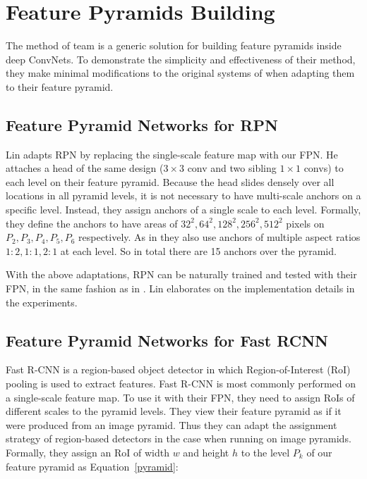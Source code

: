 \documentclass[10pt,twocolumn,letterpaper]{article}
\begin{document}
\section{Feature Pyramids Building}

The method of team is a generic solution for building feature pyramids inside deep ConvNets. To demonstrate the simplicity and effectiveness of their method, they make minimal modifications to the original systems of \cite{ren2015faster,girshick2015fast} when adapting them to their feature pyramid.

\subsection{Feature Pyramid Networks for RPN}

Lin adapts RPN by replacing the single-scale feature map with our FPN. He attaches a head of the same design ($3\times 3$ conv and two sibling $1\times 1$ convs) to each level on their feature pyramid. Because the head slides densely over all locations in all pyramid levels, it is not necessary to have multi-scale anchors on a specific level. Instead, they assign anchors of a single scale to each level. Formally, they define the anchors to have areas of ${32^2, 64^2, 128^2, 256^2, 512^2}$ pixels on ${P_2, P_3, P_4, P_5,P_6}$ respectively. As in \cite{ren2015faster} they also use anchors of multiple aspect ratios ${1:2, 1:1, 2:1}$ at each level. So in total there are 15 anchors over the pyramid.

With the above adaptations, RPN can be naturally trained and tested with their FPN, in the same fashion as in \cite{ren2015faster}. Lin elaborates on the implementation details in the experiments.

\subsection{Feature Pyramid Networks for Fast RCNN}

Fast R-CNN \cite{girshick2015fast} is a region-based object detector in which Region-of-Interest (RoI) pooling is used to extract features. Fast R-CNN is most commonly performed on a single-scale feature map. To use it with their FPN, they need to assign RoIs of different scales to the pyramid levels. They view their feature pyramid as if it were produced from an image pyramid. Thus they can adapt the assignment strategy of region-based detectors \cite{girshick2015fast,he2014spatial} in the case when running on image pyramids. Formally, they assign an RoI of width $w$ and height $h$ to the level $P_k$ of our feature pyramid as Equation~\ref{pyramid}:
\end{document}
